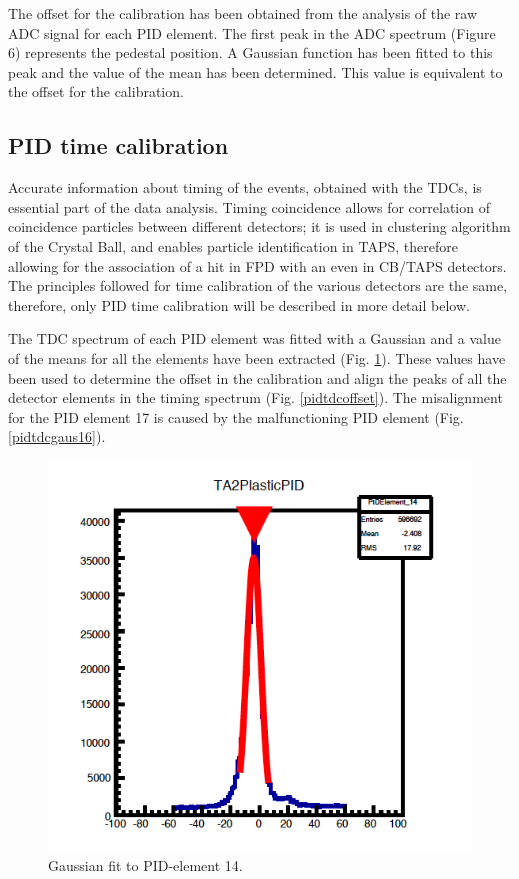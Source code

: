 \indent The offset for the calibration has been obtained from the analysis of the raw ADC signal for each PID element. The first peak in the ADC spectrum (Figure 6) represents the pedestal position. A Gaussian function has been fitted to this peak and the value of the mean has been determined. This value is equivalent to the offset for the calibration.

\subsection{PID time calibration}

\indent Accurate information about timing of the events, obtained with the TDCs, is essential part of the data analysis. Timing coincidence allows for correlation of coincidence particles between different detectors; it is used in clustering algorithm of the Crystal Ball, and enables particle identification in TAPS, therefore allowing for the association of a hit in FPD with an even in CB/TAPS detectors. The principles followed for time calibration of the various detectors are the same, therefore, only PID time calibration will be described in more detail below.

\indent The TDC spectrum of each PID element was fitted with a Gaussian and a value of the means for all the elements have been extracted (Fig. \ref{pidtdcgaus}). These values have been used to determine the offset in the calibration and align the peaks of all the detector elements in the timing spectrum (Fig. \ref{pidtdcoffset}). The misalignment for the PID element 17 is caused by the malfunctioning PID element (Fig. \ref{pidtdcgaus16}).

\begin{figure}[H]
\begin{center}
\includegraphics[scale=0.4]{pictures/png/pidtdcgaus.png}
\caption{Gaussian fit to PID-element 14.}
\label{pidtdcgaus}
\end{center}
\end{figure}


